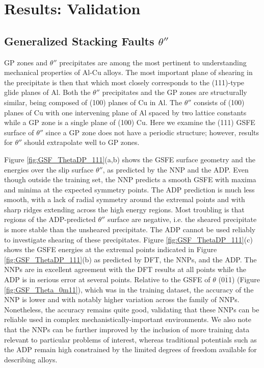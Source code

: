 \documentclass{article}
\begin{document}
\section{Results: Validation}

\subsection{Generalized Stacking Faults $\theta''$} \label{sct:gsf_theta_dp}

GP zones and $\theta''$ precipitates are among the most pertinent to understanding mechanical properties of Al-Cu alloys\cite{Nie2014PhysicalAlloys}. 
The most important plane of shearing in the precipitate is then that which most closely corresponds to the (111)-type glide planes of Al.
Both the $\theta''$ precipitates and the GP zones are structurally similar, being composed of (100) planes of Cu in Al. 
The $\theta''$ consists of (100) planes of Cu with one intervening plane of Al spaced by two lattice constants while a GP zone is a single plane of (100) Cu. Here we examine the (111) GSFE surface of $\theta''$ since a GP zone does not have a periodic structure; however, results for $\theta''$ should extrapolate well to GP zones.

Figure \ref{fig:GSF_ThetaDP_111}(a,b) shows the GSFE surface geometry and the energies over the slip surface $\theta''$, as predicted by the NNP and the ADP.  
Even though outside the training set, the NNP predicts a smooth GSFE with maxima and minima at the expected symmetry points.  The ADP prediction is much less smooth, with a lack of radial symmetry around the extremal points and with sharp ridges extending across the high energy regions.
Most troubling is that regions of the ADP-predicted $\theta''$ surface are negative, i.e. the sheared precipitate is more stable than the unsheared precipitate.  The ADP cannot be used reliably to investigate shearing of these precipitates.
Figure \ref{fig:GSF_ThetaDP_111}(c) shows the GSFE energies at the extremal points indicated in Figure \ref{fig:GSF_ThetaDP_111}(b) as predicted by DFT, the NNPs, and the ADP.
The NNPs are in excellent agreement with the DFT results at all points while the ADP is in serious error at several points.
Relative to the GSFE of $\theta$ (0$\overline{1}$1) (Figure \ref{fig:GSF_Theta_0m11}), which was in the training dataset, the accuracy of the NNP is lower and with notably higher variation across the family of NNPs.
Nonetheless, the accuracy remains quite good, validating that these NNPs can be reliable used in complex mechanistically-important environments.
We also note that the NNPs can be further improved by the inclusion of more training data relevant to particular problems of interest, whereas traditional potentials such as the ADP remain high constrained by the limited degrees of freedom available for describing alloys.
\end{document}
